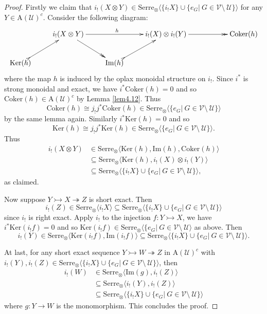 \documentclass[10pt,a4paper]{amsart}
\begin{document}
\begin{proof} Firstly we claim that $i_{!}(X\otimes Y)\in \mathrm{Serre}_{\otimes}\langle \{i_{!}X\}\cup \{e_{G}|~G\in \mathcal{V}\setminus~\mathcal{U}\}\rangle$ for any $Y\in \mathrm{A}(\mathcal{U})^{c}$.  Consider the following diagram: $$\xymatrix{
                & i_{!}(X\otimes Y) \ar@{->>}[dr] \ar[rr]^{h} & &i_{!}(X)\otimes i_{!}(Y) \ar@{->>}[rr] & & \mathrm{Coker}(h)         \\
 \mathrm{Ker}(h) \ar@{>->}[ur] & &     \mathrm{Im}(h)\ar@{>->}[ur]       }
$$
where the map $h$ is induced by the oplax monoidal structure on $i_{!}$. Since $i^{*}$ is strong monoidal and exact, we have $i^{*}\mathrm{Coker}(h)=0$ and so $\mathrm{Coker}(h)\in \mathrm{A}(\mathcal{U})^{c}$ by Lemma \ref{lem4.12}. Thus $$\mathrm{Coker}(h)\cong j_{!}j^{*}\mathrm{Coker}(h)\in \mathrm{Serre}_{\otimes}\langle \{e_{G}|~G\in \mathcal{V}\setminus~\mathcal{U}\}\rangle$$ by the same lemma again. Similarly $i^{*}\mathrm{Ker}(h)=0$ and so $$\mathrm{Ker}(h)\cong j_{!}j^{*}\mathrm{Ker}(h)\in \mathrm{Serre}_{\otimes}\langle \{e_{G}|~G\in \mathcal{V}\setminus~\mathcal{U}\}\rangle.$$
Thus \begin{align*}
  i_{!}(X\otimes Y) &\in \mathrm{Serre}_{\otimes}\langle \mathrm{Ker}(h), \mathrm{Im}(h), \mathrm{Coker}(h) \rangle\\
  &\subseteq \mathrm{Serre}_{\otimes}\langle \mathrm{Ker}(h), i_{!}(X)\otimes i_{!}(Y) \rangle\\
  &\subseteq \mathrm{Serre}_{\otimes}\langle  \{i_{!}X\}\cup \{e_{G}|~G\in \mathcal{V}\setminus~\mathcal{U}\} \rangle,
\end{align*}
as claimed.

Now suppose $Y\rightarrowtail X\twoheadrightarrow Z$ is short exact. Then $$ i_{!}(Z)\in \mathrm{Serre}_{\otimes}\langle  i_{!}X \rangle\subseteq \mathrm{Serre}_{\otimes}\langle  \{i_{!}X\}\cup \{e_{G}|~G\in \mathcal{V}\setminus~\mathcal{U}\} \rangle$$ since $i_{!}$ is right exact. Apply $i_{!}$ to the injection $f:Y\rightarrowtail X$, we have $i^{*}\mathrm{Ker}(i_{!}f)=0$ and so $\mathrm{Ker}(i_{!}f)\in \mathrm{Serre}_{\otimes}\langle \{e_{G}|~G\in \mathcal{V}\setminus~\mathcal{U}\rangle$ as above. Then $$i_{!}(Y)\in \mathrm{Serre}_{\otimes}\langle \mathrm{Ker}(i_{!}f), \mathrm{Im}(i_{!}f)\rangle \subseteq \mathrm{Serre}_{\otimes}\langle  \{i_{!}X\}\cup \{e_{G}|~G\in \mathcal{V}\setminus~\mathcal{U}\} \rangle.$$

At last, for any short exact sequence $Y\rightarrowtail W\twoheadrightarrow Z$ in $\mathrm{A}(\mathcal{U})^{c}$ with $i_{!}(Y), i_{!}(Z)\in  \mathrm{Serre}_{\otimes}\langle  \{i_{!}X\}\cup \{e_{G}|~G\in \mathcal{V}\setminus~\mathcal{U}\} \rangle$, then \begin{align*}
  i_{!}(W) &\in \mathrm{Serre}_{\otimes}\langle  \mathrm{Im}(g), i_{!}(Z) \rangle\\
  &\subseteq \mathrm{Serre}_{\otimes}\langle i_{!}(Y), i_{!}(Z) \rangle\\
  &\subseteq \mathrm{Serre}_{\otimes}\langle  \{i_{!}X\}\cup \{e_{G}|~G\in \mathcal{V}\setminus~\mathcal{U}\} \rangle
\end{align*} where $g:Y\rightarrow W$ is the monomorphism. This concludes the proof.
\end{proof}
\end{document}
